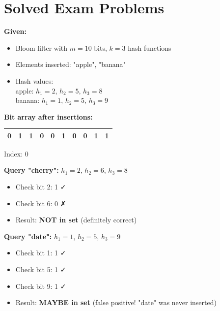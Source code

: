 \section{Solved Exam Problems}

\begin{examplebox}
\textbf{Given:}
\begin{itemize}
    \item Bloom filter with $m = 10$ bits, $k = 3$ hash functions
    \item Elements inserted: "apple", "banana"
    \item Hash values: \\
        apple: $h_1 = 2$, $h_2 = 5$, $h_3 = 8$ \\
        banana: $h_1 = 1$, $h_2 = 5$, $h_3 = 9$
\end{itemize}

\textbf{Bit array after insertions:}
\begin{center}
\begin{tabular}{|c|c|c|c|c|c|c|c|c|c|}
\hline
0 & 1 & 1 & 0 & 0 & 1 & 0 & 0 & 1 & 1 \\
\hline
\end{tabular}

Index: 0         
\end{center}

\textbf{Query "cherry":} $h_1 = 2$, $h_2 = 6$, $h_3 = 8$
\begin{itemize}
    \item Check bit 2: 1 ✓
    \item Check bit 6: 0 ✗
    \item Result: \textbf{NOT in set} (definitely correct)
\end{itemize}

\textbf{Query "date":} $h_1 = 1$, $h_2 = 5$, $h_3 = 9$
\begin{itemize}
    \item Check bit 1: 1 ✓
    \item Check bit 5: 1 ✓
    \item Check bit 9: 1 ✓
    \item Result: \textbf{MAYBE in set} (false positive! "date" was never inserted)
\end{itemize}
\end{examplebox}

